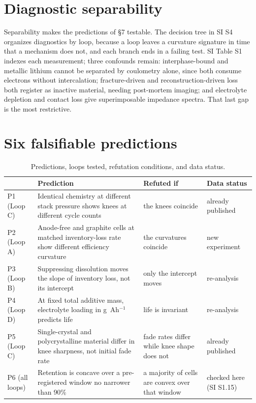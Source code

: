 \documentclass[AMA,Times2COL]{WileyNJDv5}
\begin{document}
\section{Diagnostic separability}\label{sec:Diagnosticseparability}
Separability makes the predictions of \S7 testable. The decision tree in SI S4 organizes diagnostics by loop, because a loop leaves a curvature signature in time that a mechanism does not, and each branch ends in a failing test.\cite{prosser2021lithium,costa2022battery,gunnarsdottir2020noninvasive} SI Table S1 indexes each measurement; three confounds remain: interphase-bound and metallic lithium cannot be separated by coulometry alone, since both consume electrons without intercalation;\cite{mcshane2020quantification} fracture-driven and reconstruction-driven loss both register as inactive material, needing post-mortem imaging; and electrolyte depletion and contact loss give superimposable impedance spectra. That last gap is the most restrictive.

\section{Six falsifiable predictions}\label{sec:Sixfalsifiablepredictions}

\begin{table}[t]
\caption{Predictions, loops tested, refutation conditions, and data status.}
\label{tab2}
\small
\begin{tabularx}{\textwidth}{@{}l>{\raggedright\arraybackslash}X>{\raggedright\arraybackslash}X>{\raggedright\arraybackslash}p{}@{}}
\toprule
 & Prediction & Refuted if & Data status\\
\midrule
P1 (Loop C) & Identical chemistry at different stack pressure shows knees at different cycle counts & the knees coincide & already published\\
P2 (Loop A) & Anode-free and graphite cells at matched inventory-loss rate show different efficiency curvature & the curvatures coincide & new experiment\\
P3 (Loop B) & Suppressing dissolution moves the slope of inventory loss, not its intercept & only the intercept moves & re-analysis\\
P4 (Loop D) & At fixed total additive mass, electrolyte loading in g~Ah$^{-1}$ predicts life & life is invariant & re-analysis\\
P5 (Loop C) & Single-crystal and polycrystalline material differ in knee sharpness, not initial fade rate & fade rates differ while knee shape does not & already published\\
P6 (all loops) & Retention is concave over a pre-registered window no narrower than 90\% & a majority of cells are convex over that window & checked here (SI S1.15)\\
\bottomrule
\end{tabularx}
\end{table}
\end{document}
